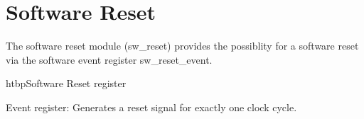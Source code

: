 \section{Software Reset}
The software reset module (sw\_reset) provides the possiblity for a software reset via the software event register sw\_reset\_event.

\begin{register}{htbp}{Software Reset register}{}%
	\label{tcm_ctrl_reg}%
	\regnewline%

	\begin{regdesc}
	\begin{reglist}
		\item [sw\_reset\_event] Event register: Generates a reset signal for exactly one clock cycle.
	\end{reglist}
	\end{regdesc}
\end{register}

% 
% 
%  

\clearpage
